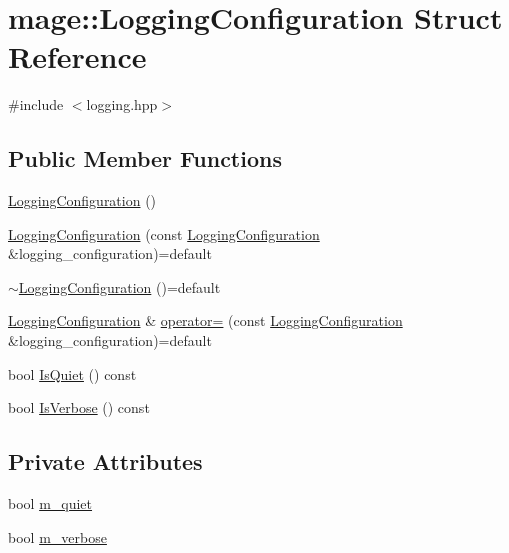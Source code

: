 \hypertarget{structmage_1_1_logging_configuration}{}\section{mage\+:\+:Logging\+Configuration Struct Reference}
\label{structmage_1_1_logging_configuration}


{\ttfamily \#include $<$logging.\+hpp$>$}

\subsection*{Public Member Functions}
\begin{DoxyCompactItemize}
\item 
\hyperlink{structmage_1_1_logging_configuration_a3d397c3ce26c1c42c9ae4a391391c6f9}{Logging\+Configuration} ()
\item 
\hyperlink{structmage_1_1_logging_configuration_a8e4ccd4301f5544213edd3b600cccff9}{Logging\+Configuration} (const \hyperlink{structmage_1_1_logging_configuration}{Logging\+Configuration} \&logging\+\_\+configuration)=default
\item 
\hyperlink{structmage_1_1_logging_configuration_a842cd1d5cf22c9fb6e2c76e684cd08ee}{$\sim$\+Logging\+Configuration} ()=default
\item 
\hyperlink{structmage_1_1_logging_configuration}{Logging\+Configuration} \& \hyperlink{structmage_1_1_logging_configuration_af35d0b0a2f5743944d3d9d66580074db}{operator=} (const \hyperlink{structmage_1_1_logging_configuration}{Logging\+Configuration} \&logging\+\_\+configuration)=default
\item 
bool \hyperlink{structmage_1_1_logging_configuration_ac081313b7a9440bcd73b6a9b69ff3452}{Is\+Quiet} () const
\item 
bool \hyperlink{structmage_1_1_logging_configuration_a13d91de33f888eee31f4d4e6b1237675}{Is\+Verbose} () const
\end{DoxyCompactItemize}
\subsection*{Private Attributes}
\begin{DoxyCompactItemize}
\item 
bool \hyperlink{structmage_1_1_logging_configuration_a38f457d5db84d15e008841ca8653b47c}{m\+\_\+quiet}
\item 
bool \hyperlink{structmage_1_1_logging_configuration_a60f052c2bb702d8153188e93f00427ac}{m\+\_\+verbose}
\end{DoxyCompactItemize}


